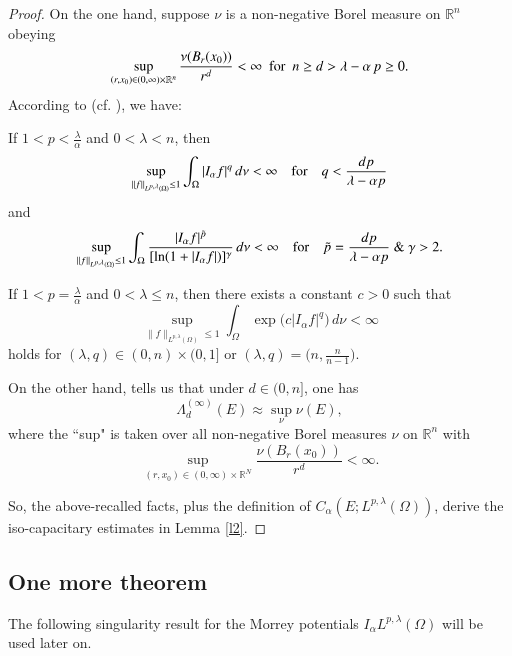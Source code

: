 \documentclass[12pt]{amsart}
\begin{document}
\begin{proof} On the one hand, suppose $\nu$ is a non-negative Borel measure on $\mathbb R^n$ obeying
\begin{equation*}\label{eqMeaL}
   \sup_{(r,x_0)\in (0,\infty)\times\mathbb R^n}\frac{\nu(B_r(x_0))}{r^d}<\infty\ \ \hbox{for}\ \
n\ge d >\lambda - \alpha \,p\ge 0.
\end{equation*}
According to \cite[Theorem 3.1]{AX2011b} (cf. \cite{AX2011a}), we have:

 If $1<p<\frac{\lambda}{\alpha}$ and
$0<\lambda<n$, then
\begin{equation*}\label{eqTr32aL}
\sup_{\|f\|_{L^{p,\lambda}(\Omega)}\le1}\int_{\Omega}
|I_{\alpha}f|^{q} \, d\nu<\infty\quad\hbox{for}\quad
q<\dfrac{dp}{\lambda -\alpha p}
\end{equation*}
and
\begin{equation*}\label{eqTrIm32aL}
\sup_{\|f\|_{L^{p,\lambda}(\Omega)}\le1}\int_{\Omega}
\frac{|I_{\alpha}f|^{\tilde{p}}}{[\ln(1+|I_\alpha f|)]^\gamma} \,
d\nu<\infty\quad\hbox{for}\quad\tilde{p}=\dfrac{dp}{\lambda -\alpha
p}\ \&\ \gamma>2.
\end{equation*}

 If $1<p=\frac{\lambda}{\alpha}$ and
$0<\lambda\le n$, then there exists a constant $c>0$ such that
\begin{equation*}\label{eqTr2aa}
\sup_{\|f\|_{L^{p,\lambda}(\Omega)}\le 1}\int_{\Omega}
\exp\big(c|I_{\alpha}f|^{q}\big) \, d\nu<\infty
\end{equation*}
holds for $(\lambda,q)\in (0,n)\times (0,1]$ or
$(\lambda,q)=\Big(n,\frac{n}{n-1}\Big)$.

On the other hand, \cite[Corollary]{Ad} tells us that
under $d\in (0,n]$, one has
$$
\Lambda_{d}^{(\infty)}(E)\approx \sup_{\nu}\nu(E),
$$
where the ``sup" is taken over all non-negative Borel measures $\nu$
on $\mathbb R^n$ with
$$
\sup_{(r,x_0)\in (0,\infty)\times{\mathbb{R}}^N}\frac{\nu(B_r(x_0))}{r^d}<\infty.
$$

So, the above-recalled facts, plus the definition of
$C_\alpha(E;L^{p,\lambda}(\Omega))$, derive the iso-capacitary
estimates in Lemma \ref{l2}.
\end{proof}

\subsection{One more theorem}  The following singularity result for the Morrey potentials $I_\alpha L^{p,\lambda}(\Omega)$ will be used later on.
\end{document}
